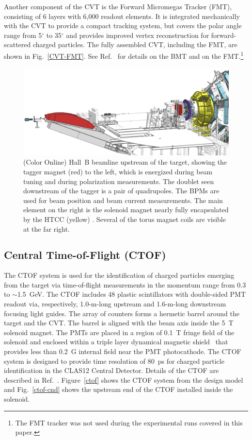 \documentclass[final,3p,twocolumn]{elsarticle}
\begin{document}
Another component of the CVT is the Forward Micromegas Tracker (FMT), consisting of 6 layers with 6,000 readout
elements. It  is integrated mechanically with the CVT to provide a compact tracking system, but covers the polar
angle range from 5$^\circ$ to 35$^\circ$ and provides improved vertex reconstruction for forward-scattered
charged particles. The fully assembled CVT, including the FMT, are shown in Fig.~\ref{CVT-FMT}.  See
Ref.~\cite{BMT} for details on the BMT and on the FMT.\footnote{The FMT tracker was not used
 during the experimental runs covered in this paper.}  



\begin{figure}[t!]
\centerline{\includegraphics[width=2.0\columnwidth]{beamline-1.png}}
\caption{(Color Online) Hall~B beamline upstream of the target, showing the tagger magnet (red) to the left, which is energized
  during beam tuning and during polarization measurements. The doublet seen downstream of the tagger is a pair
  of quadrupoles. The BPMs are used for beam position and beam current measurements. The
  main element on the right is the solenoid magnet nearly fully encapsulated by the HTCC (yellow) . Several of the torus
  magnet coils are visible at the far right.}
\label{beamline}
\end{figure}
\subsection{Central Time-of-Flight (CTOF)}

The CTOF system is used for the identification of charged particles emerging from the target via time-of-flight
measurements in the momentum range from 0.3 to $\sim$1.5~GeV. The CTOF includes 48 plastic scintillators with
double-sided PMT readout via, respectively, 1.0-m-long upstream and 1.6-m-long downstream focusing light guides.
The array of counters forms a hermetic barrel around the target and the CVT. The barrel is aligned with the beam
axis inside the 5~T solenoid magnet. The PMTs are placed in a region of 0.1~T fringe field of the solenoid and
enclosed within a triple layer dynamical magnetic shield~\cite{Baturin:2012zz} that provides less than 0.2~G
internal field near the PMT photocathode. The CTOF system is designed to provide time resolution of 80~ps for
charged particle identification in the CLAS12 Central Detector. Details of the CTOF are described in
Ref.~\cite{ctof-nim}. Figure~\ref{ctof} shows the CTOF system from the design model and Fig.~\ref{ctof-cnd}
shows the upstream end of the CTOF installed inside the solenoid.
\end{document}
